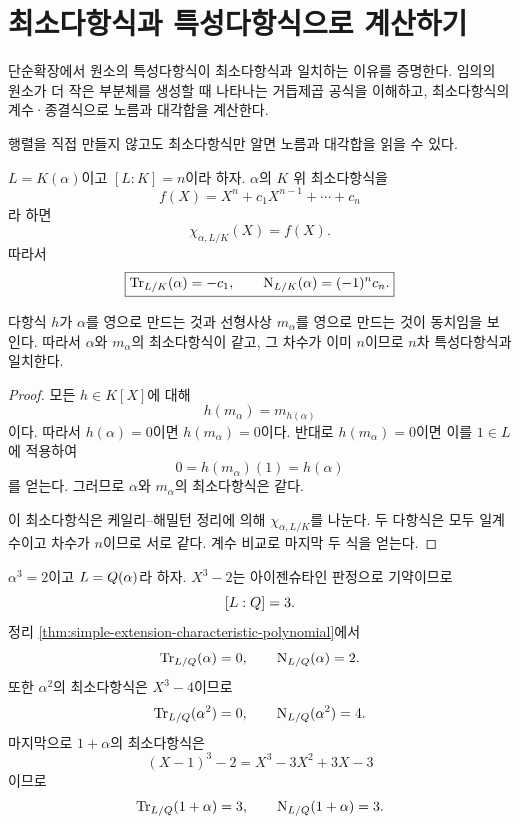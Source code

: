 \clearpage
\section{최소다항식과 특성다항식으로 계산하기}
\label{sec:norm-trace-minimal-polynomial}

\begin{learninggoal}
단순확장에서 원소의 특성다항식이 최소다항식과 일치하는 이유를 증명한다. 임의의 원소가 더 작은 부분체를 생성할 때 나타나는 거듭제곱 공식을 이해하고, 최소다항식의 계수·종결식으로 노름과 대각합을 계산한다.
\end{learninggoal}

행렬을 직접 만들지 않고도 최소다항식만 알면 노름과 대각합을 읽을 수 있다.

\begin{theorem}
\label{thm:simple-extension-characteristic-polynomial}
$L=K(\alpha)$이고 $[L:K]=n$이라 하자. $\alpha$의 $K$ 위 최소다항식을
\[
  f(X)=X^n+c_1X^{n-1}+\cdots+c_n
\]
라 하면
\[
  \boxed{\chi_{\alpha,L/K}(X)=f(X).}
\]
따라서
\[
  \boxed{
  \operatorname{Tr}_{L/K}(\alpha)=-c_1,
  \qquad
  \operatorname{N}_{L/K}(\alpha)=(-1)^n c_n.}
\]
\end{theorem}

\begin{proofidea}
다항식 $h$가 $\alpha$를 영으로 만드는 것과 선형사상 $m_\alpha$를 영으로 만드는 것이 동치임을 보인다. 따라서 $\alpha$와 $m_\alpha$의 최소다항식이 같고, 그 차수가 이미 $n$이므로 $n$차 특성다항식과 일치한다.
\end{proofidea}

\begin{proof}
모든 $h\in K[X]$에 대해
\[
  h(m_\alpha)=m_{h(\alpha)}
\]
이다. 따라서 $h(\alpha)=0$이면 $h(m_\alpha)=0$이다. 반대로
$h(m_\alpha)=0$이면 이를 $1\in L$에 적용하여
\[
  0=h(m_\alpha)(1)=h(\alpha)
\]
를 얻는다. 그러므로 $\alpha$와 $m_\alpha$의 최소다항식은 같다.

이 최소다항식은 케일리--해밀턴 정리에 의해
$\chi_{\alpha,L/K}$를 나눈다. 두 다항식은 모두 일계수이고 차수가 $n$이므로 서로 같다. 계수 비교로 마지막 두 식을 얻는다.
\end{proof}

\begin{example}[순수 삼차확장]
$\alpha^3=2$이고 $L=Q(\alpha)$라 하자. $X^3-2$는 아이젠슈타인 판정으로 기약이므로
\[
  [L:Q]=3.
\]
정리 \ref{thm:simple-extension-characteristic-polynomial}에서
\[
  \operatorname{Tr}_{L/Q}(\alpha)=0,
  \qquad
  \operatorname{N}_{L/Q}(\alpha)=2.
\]
또한 $\alpha^2$의 최소다항식은 $X^3-4$이므로
\[
  \operatorname{Tr}_{L/Q}(\alpha^2)=0,
  \qquad
  \operatorname{N}_{L/Q}(\alpha^2)=4.
\]
마지막으로 $1+\alpha$의 최소다항식은
\[
  (X-1)^3-2
  =X^3-3X^2+3X-3
\]
이므로
\[
  \operatorname{Tr}_{L/Q}(1+\alpha)=3,
  \qquad
  \operatorname{N}_{L/Q}(1+\alpha)=3.
\]
\end{example}

